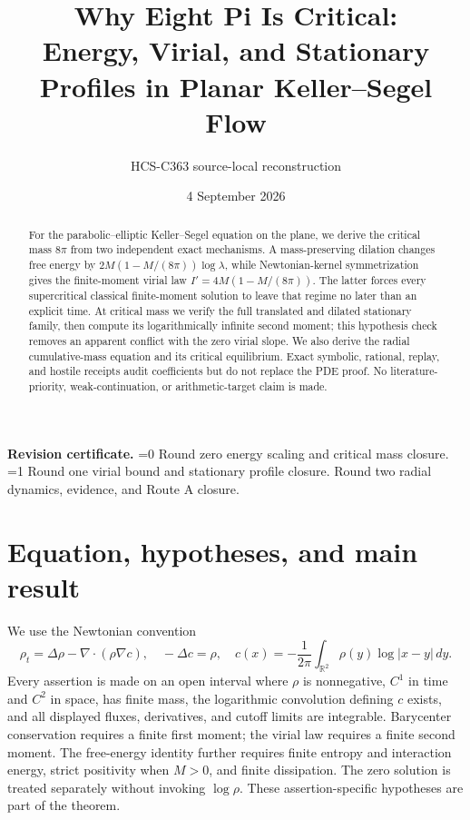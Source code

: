 \documentclass[10pt]{article}
\title{Why Eight Pi Is Critical:\\
Energy, Virial, and Stationary Profiles in Planar Keller--Segel Flow}
\author{HCS-C363 source-local reconstruction}
\date{4 September 2026}
\providecommand{\CRevisionRound}{2}
\newcommand{\Rtwo}{\mathbb R^2}
\begin{document}
\maketitle

\begin{abstract}
For the parabolic--elliptic Keller--Segel equation on the plane, we derive the
critical mass \(8\pi\) from two independent exact mechanisms.  A
mass-preserving dilation changes free energy by
\(2M(1-M/(8\pi))\log\lambda\), while Newtonian-kernel symmetrization gives
the finite-moment virial law \(I'=4M(1-M/(8\pi))\).  The latter forces every
supercritical classical finite-moment solution to leave that regime no later
than an explicit time.  At critical mass we verify the full translated and
dilated stationary family, then compute its logarithmically infinite second
moment; this hypothesis check removes an apparent conflict with the zero
virial slope.  We also derive the radial cumulative-mass equation and its
critical equilibrium.  Exact symbolic, rational, replay, and hostile receipts
audit coefficients but do not replace the PDE proof.  No literature-priority,
weak-continuation, or arithmetic-target claim is made.
\end{abstract}

\noindent\textbf{Revision certificate.}
\ifnum\CRevisionRound=0
Round zero energy scaling and critical mass closure.
\else\ifnum\CRevisionRound=1
Round one virial bound and stationary profile closure.
\else
Round two radial dynamics, evidence, and Route A closure.
\fi\fi

\small
\section{Equation, hypotheses, and main result}

We use the Newtonian convention
\begin{equation}
 \rho_t=\Delta\rho-\nabla\!\cdot(\rho\nabla c),\quad
 -\Delta c=\rho,\quad
 c(x)=-\frac1{2\pi}\int_{\Rtwo}\rho(y)\log|x-y|\,dy. \label{eq:pde}
\end{equation}
Every assertion is made on an open interval where $\rho$ is nonnegative,
$C^1$ in time and $C^2$ in space, has finite mass, the logarithmic convolution
defining $c$ exists, and all displayed fluxes, derivatives, and cutoff limits
are integrable.  Barycenter conservation requires a finite first moment; the
virial law requires a finite second moment.  The free-energy identity further
requires finite entropy and interaction energy, strict positivity when
$M>0$, and finite dissipation.  The zero solution is treated separately
without invoking $\log\rho$.  These assertion-specific hypotheses are part of
the theorem.
\end{document}
